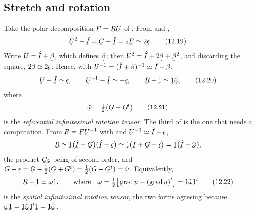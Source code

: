 \subsection*{Stretch and rotation}

Take the polar decomposition $\bF=\bR\bU$ of . From
 and ,
\begin{equation}
   \bU^{2}-\hI=\bC-\hI=2\bE\simeq2\vek{\epsilon} .
   \tag{12.19}\label{eq:12.19}
\end{equation}
Write $\bU=\hI+\vek{\beta}$, which defines $\vek{\beta}$; then
$\bU^{2}=\hI+2\vek{\beta}+\vek{\beta}^{2}$, and discarding the square,
$2\vek{\beta}\simeq2\vek{\epsilon}$. Hence, with
$\bU^{-1}=(\hI+\vek{\beta})^{-1}\simeq\hI-\vek{\beta}$,
\begin{equation}
   \bU-\hI\simeq\vek{\epsilon},\qquad
   \bU^{-1}-\hI\simeq-\vek{\epsilon},\qquad
   \bR-\shift\simeq\shift\hat{\vek{\omega}},
   \tag{12.20}\label{eq:12.20}
\end{equation}
where
\begin{equation}
   \hat{\vek{\omega}}=\tfrac12\big(\bG-\bG^{t}\big)
   \tag{12.21}\label{eq:12.21}
\end{equation}
is the \emph{referential infinitesimal rotation tensor}. The third of
 is the one that needs a computation. From $\bR=\bF\bU^{-1}$
with  and $\bU^{-1}\simeq\hI-\vek{\epsilon}$,
\[
   \bR\simeq\shift\big(\hI+\bG\big)\big(\hI-\vek{\epsilon}\big)
   \simeq\shift\big(\hI+\bG-\vek{\epsilon}\big)
   =\shift\big(\hI+\hat{\vek{\omega}}\big),
\]
the product $\bG\vek{\epsilon}$ being of second order, and
$\bG-\vek{\epsilon}=\bG-\tfrac12(\bG+\bG^{t})
=\tfrac12(\bG-\bG^{t})=\hat{\vek{\omega}}$. Equivalently,
\begin{equation}
   \bR-\shift\simeq\vek{\omega}\shift,\qquad\text{where}\quad
   \vek{\omega}=\tfrac12\big[\grad\bu-(\grad\bu)^{t}\big]
   =\shift\hat{\vek{\omega}}\shift^{t}
   \tag{12.22}\label{eq:12.22}
\end{equation}
is the \emph{spatial infinitesimal rotation tensor}, the two forms
agreeing because
$\vek{\omega}\shift=\shift\hat{\vek{\omega}}\shift^{t}\shift
=\shift\hat{\vek{\omega}}$.

